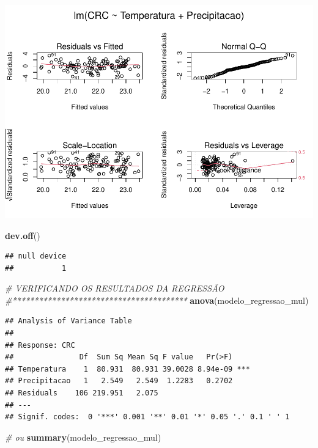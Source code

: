 \documentclass[
]{book}
\newenvironment{Shaded}{\begin{snugshade}}{\end{snugshade}}
\newcommand{\CommentTok}[1]{\textcolor[rgb]{0.56,0.35,0.01}{\textit{#1}}}
\newcommand{\KeywordTok}[1]{\textcolor[rgb]{0.13,0.29,0.53}{\textbf{#1}}}
\newcommand{\NormalTok}[1]{#1}
\begin{document}
\includegraphics{livro_r_ecologia_files/figure-latex/unnamed-chunk-11-1.pdf}

\begin{Shaded}
\begin{Highlighting}[]
\KeywordTok{dev.off}\NormalTok{()}
\end{Highlighting}
\end{Shaded}

\begin{verbatim}
## null device 
##           1
\end{verbatim}

\begin{Shaded}
\begin{Highlighting}[]
\CommentTok{# VERIFICANDO OS RESULTADOS DA REGRESSÃO}
\CommentTok{#****************************************}
\KeywordTok{anova}\NormalTok{(modelo_regressao_mul)}
\end{Highlighting}
\end{Shaded}

\begin{verbatim}
## Analysis of Variance Table
## 
## Response: CRC
##               Df  Sum Sq Mean Sq F value   Pr(>F)    
## Temperatura    1  80.931  80.931 39.0028 8.94e-09 ***
## Precipitacao   1   2.549   2.549  1.2283   0.2702    
## Residuals    106 219.951   2.075                     
## ---
## Signif. codes:  0 '***' 0.001 '**' 0.01 '*' 0.05 '.' 0.1 ' ' 1
\end{verbatim}

\begin{Shaded}
\begin{Highlighting}[]
\CommentTok{# ou}
\KeywordTok{summary}\NormalTok{(modelo_regressao_mul)}
\end{Highlighting}
\end{Shaded}
\end{document}
